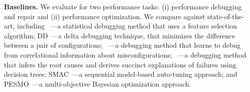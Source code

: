 








\noindent
\textbf{Baselines.} 
We evaluate \ourapproach for two performance tasks: (i) performance debugging and repair and (ii) performance optimization. We compare \ourapproach against state-of-the-art, including \cbi~\cite{song2014statistical}---a statistical debugging method that uses a feature selection algorithm; \textsc{DD}~\cite{artho2011iterative}---a delta debugging technique, that minimizes the difference between a pair of configurations; 
\encore~\cite{zhang2014encore}---a debugging method that learns to debug from correlational information about misconfigurations;
\bugdoc~\cite{lourencco2020bugdoc}---a debugging method that infers the root causes and derives succinct explanations of failures using decision trees;
\textsc{SMAC}~\cite{hutter2011sequential}---a sequential model-based auto-tuning approach; and \textsc{PESMO}~\cite{hernandez2016predictive}---a multi-objective Bayesian optimization approach.

